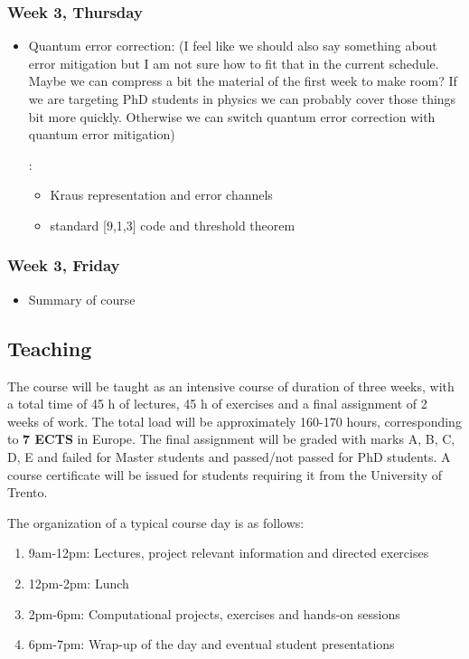 \documentclass[twocolumn,superscriptaddress,amsmath,amssymb,
aps,floatfix]{revtex4-2}
\newcommand{\ale}[1]{{\color{blue}{\bf Ale}: #1}}
\begin{document}
    \subsubsection{Week 3, Thursday}\label{week-3-thursday}

\begin{itemize}
\item
  Quantum error correction\ale{(I feel like we should also say something about error mitigation but I am not sure how to fit that in the current schedule. Maybe we can compress a bit the material of the first week to make room? If we are targeting PhD students in physics we can probably cover those things  bit more quickly. Otherwise we can switch quantum error correction with quantum error mitigation)}
  \ale{\begin{itemize}
      \item Kraus representation and error channels
      \item standard [9,1,3] code and threshold theorem
  \end{itemize}}
\end{itemize}

    \subsubsection{Week 3, Friday}\label{week-3-friday}

\begin{itemize}
\item
  Summary of course
\end{itemize}

    \subsection{Teaching}\label{teaching}

The course will be taught as an intensive course of duration of three
weeks, with a total time of 45 h of lectures, 45 h of exercises and a
final assignment of 2 weeks of work. The total load will be
approximately 160-170 hours, corresponding to \textbf{7 ECTS} in Europe.
The final assignment will be graded with marks A, B, C, D, E and failed
for Master students and passed/not passed for PhD students. A course
certificate will be issued for students requiring it from the University
of Trento.

The organization of a typical course day is as follows:

\begin{enumerate}
\def\labelenumi{\arabic{enumi}.}
\item
  9am-12pm: Lectures, project relevant information and directed
  exercises
\item
  12pm-2pm: Lunch
\item
  2pm-6pm: Computational projects, exercises and hands-on sessions
\item
  6pm-7pm: Wrap-up of the day and eventual student presentations
\end{enumerate}
\end{document}
